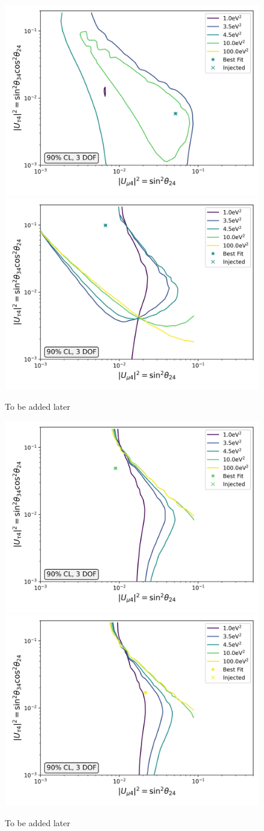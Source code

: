 \documentclass[main.tex]{subfiles}
\begin{document}
\begin{figure}
    \centering
    \includegraphics[width=0.45\linewidth]{figures/inject_recover_RealIR_2_sterile_4_cl0.9_dof3.png}%
    \includegraphics[width=0.45\linewidth]{figures/inject_recover_RealIR_3_sterile_4_cl0.9_dof3.png}
    \caption{To be added later}
\end{figure}


\begin{figure}
    \centering
    \includegraphics[width=0.45\linewidth]{figures/inject_recover_RealIR_5_sterile_1_cl0.9_dof3.png}%
    \includegraphics[width=0.45\linewidth]{figures/inject_recover_RealIR_6_sterile_1_cl0.9_dof3.png}
    \caption{To be added later}
\end{figure}
\end{document}
